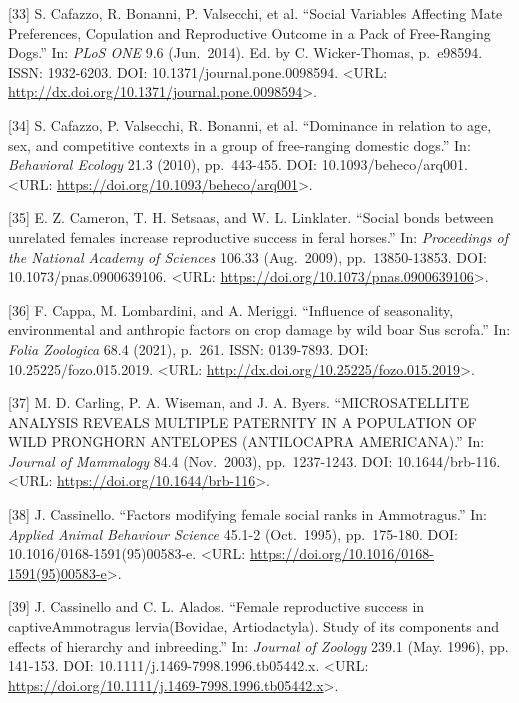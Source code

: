 \documentclass[
]{article}
\begin{document}
{[}33{]} S. Cafazzo, R. Bonanni, P. Valsecchi, et al. ``Social Variables
Affecting Mate Preferences, Copulation and Reproductive Outcome in a
Pack of Free-Ranging Dogs.'' In: \emph{PLoS ONE} 9.6 (Jun.~2014). Ed. by
C. Wicker-Thomas, p.~e98594. ISSN: 1932-6203. DOI:
10.1371/journal.pone.0098594. \textless URL:
\url{http://dx.doi.org/10.1371/journal.pone.0098594}\textgreater.

{[}34{]} S. Cafazzo, P. Valsecchi, R. Bonanni, et al. ``Dominance in
relation to age, sex, and competitive contexts in a group of
free-ranging domestic dogs.'' In: \emph{Behavioral Ecology} 21.3 (2010),
pp.~443-455. DOI: 10.1093/beheco/arq001. \textless URL:
\url{https://doi.org/10.1093/beheco/arq001}\textgreater.

{[}35{]} E. Z. Cameron, T. H. Setsaas, and W. L. Linklater. ``Social
bonds between unrelated females increase reproductive success in feral
horses.'' In: \emph{Proceedings of the National Academy of Sciences}
106.33 (Aug.~2009), pp.~13850-13853. DOI: 10.1073/pnas.0900639106.
\textless URL:
\url{https://doi.org/10.1073/pnas.0900639106}\textgreater.

{[}36{]} F. Cappa, M. Lombardini, and A. Meriggi. ``Influence of
seasonality, environmental and anthropic factors on crop damage by wild
boar Sus scrofa.'' In: \emph{Folia Zoologica} 68.4 (2021), p.~261. ISSN:
0139-7893. DOI: 10.25225/fozo.015.2019. \textless URL:
\url{http://dx.doi.org/10.25225/fozo.015.2019}\textgreater.

{[}37{]} M. D. Carling, P. A. Wiseman, and J. A. Byers. ``MICROSATELLITE
ANALYSIS REVEALS MULTIPLE PATERNITY IN A POPULATION OF WILD PRONGHORN
ANTELOPES (ANTILOCAPRA AMERICANA).'' In: \emph{Journal of Mammalogy}
84.4 (Nov.~2003), pp.~1237-1243. DOI: 10.1644/brb-116. \textless URL:
\url{https://doi.org/10.1644/brb-116}\textgreater.

{[}38{]} J. Cassinello. ``Factors modifying female social ranks in
Ammotragus.'' In: \emph{Applied Animal Behaviour Science} 45.1-2
(Oct.~1995), pp.~175-180. DOI: 10.1016/0168-1591(95)00583-e.
\textless URL:
\url{https://doi.org/10.1016/0168-1591(95)00583-e}\textgreater.

{[}39{]} J. Cassinello and C. L. Alados. ``Female reproductive success
in captiveAmmotragus lervia(Bovidae, Artiodactyla). Study of its
components and effects of hierarchy and inbreeding.'' In: \emph{Journal
of Zoology} 239.1 (May. 1996), pp. 141-153. DOI:
10.1111/j.1469-7998.1996.tb05442.x. \textless URL:
\url{https://doi.org/10.1111/j.1469-7998.1996.tb05442.x}\textgreater.
\end{document}
